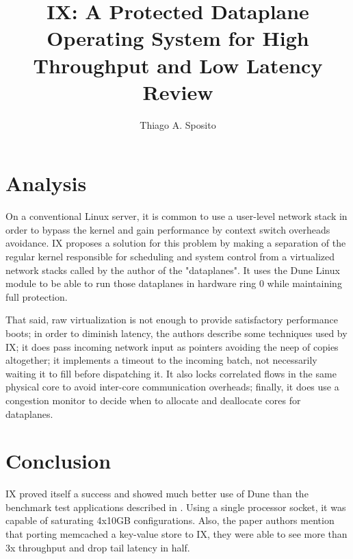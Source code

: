 \documentclass[12pt]{article}
\title{ IX: A Protected Dataplane Operating System for High Throughput and Low Latency Review}
\author{Thiago A. Sposito\inst{1} }
\begin{document}
 

\maketitle

\section{Analysis}
On a conventional Linux server, it is common to use a user-level network stack in order to bypass the kernel and gain performance by context switch overheads avoidance. IX \cite{belay2014ix}proposes a solution for this problem by making a separation of the regular kernel responsible for scheduling and system control from a  virtualized network stacks called by the author of the "dataplanes". It uses the Dune \cite{belay2012dune} Linux module to be able to run those dataplanes in hardware ring 0 while maintaining full protection.

That said, raw virtualization is not enough to provide satisfactory performance boots; in order to diminish latency, the authors describe some techniques used by IX; it does pass incoming network input as pointers avoiding the neep of copies altogether; it implements a timeout to the incoming batch, not necessarily waiting it to fill before dispatching it. It also locks correlated flows in the same physical core to avoid inter-core communication overheads; finally, it does use a congestion monitor to decide when to allocate and deallocate cores for dataplanes.

\section{Conclusion}
IX proved itself a success and showed much better use of Dune than the benchmark test applications described in \cite{belay2012dune}. Using a single processor socket, it was capable of saturating 4x10GB configurations. Also, the paper authors mention that porting memcached a key-value store\cite{jose2011memcached} to IX, they were able to see more than 3x throughput and drop tail latency in half.


\end{document}
